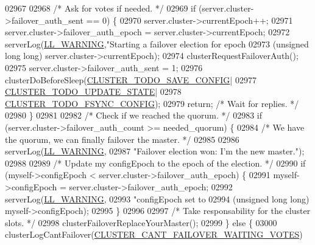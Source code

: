 \begin{DoxyCode}
{{{{{{{{{{{{{{{{{{{{{{{{{{{{{{{{{{{{{{{{{{{{{{{{{{{{{{02967 
02968     \textcolor{comment}{/* Ask for votes if needed. */}
02969     \textcolor{keywordflow}{if} (server.cluster->failover\_auth\_sent == 0) \{
02970         server.cluster->currentEpoch++;
02971         server.cluster->failover\_auth\_epoch = server.cluster->currentEpoch;
02972         serverLog(\hyperlink{server_8h_a31229b9334bba7d6be2a72970967a14b}{LL\_WARNING},\textcolor{stringliteral}{"Starting a failover election for epoch %
02973             (\textcolor{keywordtype}{unsigned} \textcolor{keywordtype}{long} \textcolor{keywordtype}{long}) server.cluster->currentEpoch);
02974         clusterRequestFailoverAuth();
02975         server.cluster->failover\_auth\_sent = 1;
02976         clusterDoBeforeSleep(\hyperlink{cluster_8h_a0ae5ff08fbae3c655012b4de8bfc327d}{CLUSTER\_TODO\_SAVE\_CONFIG}|
02977                              \hyperlink{cluster_8h_abea0d393cba342261e4a7e6fb745f388}{CLUSTER\_TODO\_UPDATE\_STATE}|
02978                              \hyperlink{cluster_8h_accc9a00230cd04789db2398bb3ab715a}{CLUSTER\_TODO\_FSYNC\_CONFIG});
02979         \textcolor{keywordflow}{return}; \textcolor{comment}{/* Wait for replies. */}
02980     \}
02981 
02982     \textcolor{comment}{/* Check if we reached the quorum. */}
02983     \textcolor{keywordflow}{if} (server.cluster->failover\_auth\_count >= needed\_quorum) \{
02984         \textcolor{comment}{/* We have the quorum, we can finally failover the master. */}
02985 
02986         serverLog(\hyperlink{server_8h_a31229b9334bba7d6be2a72970967a14b}{LL\_WARNING},
02987             \textcolor{stringliteral}{"Failover election won: I'm the new master."});
02988 
02989         \textcolor{comment}{/* Update my configEpoch to the epoch of the election. */}
02990         \textcolor{keywordflow}{if} (myself->configEpoch < server.cluster->failover\_auth\_epoch) \{
02991             myself->configEpoch = server.cluster->failover\_auth\_epoch;
02992             serverLog(\hyperlink{server_8h_a31229b9334bba7d6be2a72970967a14b}{LL\_WARNING},
02993                 \textcolor{stringliteral}{"configEpoch set to %
02994                 (\textcolor{keywordtype}{unsigned} \textcolor{keywordtype}{long} \textcolor{keywordtype}{long}) myself->configEpoch);
02995         \}
02996 
02997         \textcolor{comment}{/* Take responsability for the cluster slots. */}
02998         clusterFailoverReplaceYourMaster();
02999     \} \textcolor{keywordflow}{else} \{
03000         clusterLogCantFailover(\hyperlink{cluster_8h_abaf73be169ccef9db0795134adfd4847}{CLUSTER\_CANT\_FAILOVER\_WAITING\_VOTES})
}}}}}}}}}}}}}}}}}}}}}}}}}}}}}}}}}}}}}}}}}}}}}}}}}}}}}}}}
\end{DoxyCode}
